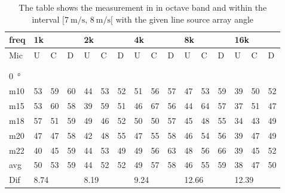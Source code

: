 \begin{table}[H]
\centering
\caption{The table shows the measurement in in octave band and within the interval $[\SI{7}{\meter\per\second},\, \SI{8}{\meter\per\second}[ $ with the given line source array angle}
\begin{tabular}{l|l|l|l|l|l|l|l|l|l|l|l|l|lll}
freq & \multicolumn{3}{l|}{1k} & \multicolumn{3}{l|}{2k} & \multicolumn{3}{l|}{4k} & \multicolumn{3}{l|}{8k} & \multicolumn{3}{l}{16k}                                \\ \hline
Mic  & U      & C      & D     & U      & C      & D     & U      & C      & D     & U      & C      & D     & \multicolumn{1}{l|}{U}  & \multicolumn{1}{l|}{C}  & D  \\ \hline
 & \multicolumn{3}{l|}{} & \multicolumn{3}{l|}{} & \multicolumn{3}{l|}{} & \multicolumn{3}{l|}{} & \multicolumn{3}{l}{}                                \\ 
 \multicolumn{16}{l}{ } \\   
\SI{0}{\degree}   & \multicolumn{3}{l|}{} & \multicolumn{3}{l|}{} & \multicolumn{3}{l|}{} & \multicolumn{3}{l|}{} & \multicolumn{3}{l}{}   \\  \hline
m10  & 53     & 59     & 60    & 44     & 53     & 52    & 51     & 56     & 57    & 47     & 53     & 59    & \multicolumn{1}{l|}{39} & \multicolumn{1}{l|}{50} & 52 \\
m15  & 53     & 60     & 58    & 39     & 59     & 51    & 46     & 67     & 56    & 44     & 64     & 57    & \multicolumn{1}{l|}{37} & \multicolumn{1}{l|}{51} & 47 \\
m18  & 57     & 51     & 59    & 49     & 46     & 52    & 50     & 50     & 57    & 45     & 48     & 55    & \multicolumn{1}{l|}{34} & \multicolumn{1}{l|}{43} & 49 \\
m20  & 47     & 47     & 58    & 42     & 48     & 55    & 47     & 55     & 58    & 46     & 54     & 56    & \multicolumn{1}{l|}{39} & \multicolumn{1}{l|}{47} & 49 \\
m22  & 40     & 45     & 59    & 44     & 53     & 49    & 49     & 56     & 63    & 48     & 56     & 66    & \multicolumn{1}{l|}{39} & \multicolumn{1}{l|}{45} & 52 \\ \hline
avg  &  50     &  53   &  59    &  44    & 52     & 52    &  49    &  57    &  58   &  46    &  55    & 59    & \multicolumn{1}{l|}{38}   & \multicolumn{1}{l|}{47}   &  50 \\ \hline  
Dif & \multicolumn{3}{l|}{8.74} & \multicolumn{3}{l|}{8.19} & \multicolumn{3}{l|}{9.24} & \multicolumn{3}{l|}{12.66} & \multicolumn{3}{l}{12.39}  \\ 

\end{tabular}
\end{table}
